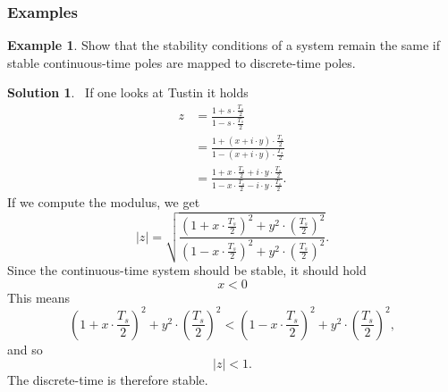 \documentclass[a4paper,12 pt]{article}
\numberwithin{equation}{section}
\theoremstyle{definition}
\newtheorem{bsp}{Example}
\theoremstyle{remark}
\theoremstyle{definition}
\newtheorem*{lsg}{Solution}
\theoremstyle{definition}
\theoremstyle{definition}
\theoremstyle{remark}
\begin{document}
\subsubsection{Examples}
\begin{bsp} Show that the stability conditions of a system remain the same if stable continuous-time poles are mapped to discrete-time poles.
\newpage 
\begin{lsg}
\
 If one looks at Tustin it holds
\begin{equation*}
\begin{split}
z&=\frac{1+s\cdot \frac{T_s}{2}}{1-s\cdot \frac{T_s}{2}}\\
&=\frac{1+(x+i\cdot y)\cdot \frac{T_s}{2}}{1-(x+i\cdot y)\cdot \frac{T_s}{2}}\\
&=\frac{1+x\cdot \frac{T_s}{2}+i\cdot y\cdot \frac{T_s}{2}}{1-x\cdot \frac{T_s}{2}-i\cdot y\cdot \frac{T_s}{2}}.
\end{split}
\end{equation*}
If we compute the modulus, we get
\begin{equation*}
|z|=\sqrt{\frac{(1+x\cdot \frac{T_s}{2})^2+y^2\cdot(\frac{T_s}{2})^2}{(1-x\cdot \frac{T_s}{2})^2+y^2\cdot(\frac{T_s}{2})^2}}.
\end{equation*}
Since the continuous-time system should be stable, it should hold
$$x<0$$
This means
\begin{equation*}
(1+x\cdot \frac{T_s}{2})^2+y^2\cdot(\frac{T_s}{2})^2<(1-x\cdot \frac{T_s}{2})^2+y^2\cdot(\frac{T_s}{2})^2,
\end{equation*}
and so $$|z|<1.$$ The discrete-time is therefore stable.
\end{lsg}
\end{bsp}

\newpage
\end{document}
